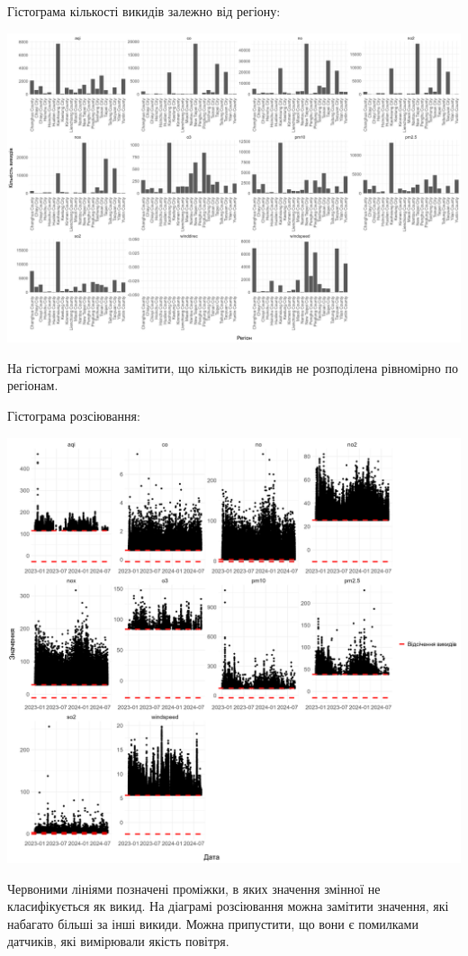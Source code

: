 \documentclass{article}
\begin{document}
\begin{enumerate}
    Гістограма кількості викидів залежно від регіону:

    \includegraphics[width=6in]{plots/outliers/count-bar-county.png}

    На гістограмі можна замітити, що кількість викидів не розподілена рівномірно
    по регіонам.

    \pagebreak

    Гістограма розсіювання:

    \includegraphics[width=6in]{plots/outliers/scatter.png}

    Червоними лініями позначені проміжки, в яких значення змінної не класифікується
    як викид. На діаграмі розсіювання можна замітити значення, які набагато більші за
    інші викиди. Можна припустити, що вони є помилками датчиків, які вимірювали якість
    повітря.


\end{enumerate}
\end{document}
